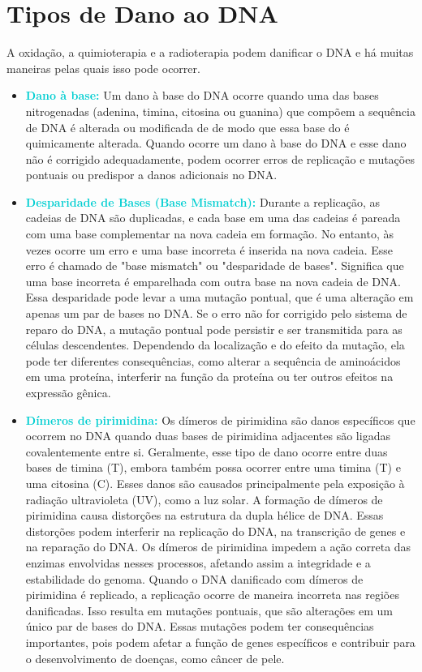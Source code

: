 \documentclass[11pt,a4paper]{article}
\begin{document}
\section{Tipos de Dano ao DNA}

	A oxidação, a quimioterapia e a radioterapia podem danificar o DNA e há muitas maneiras pelas quais isso pode ocorrer.

	\begin{itemize}[label=\textcolor{CarnationPink}{$\blacktriangleright$}]
		\item \textcolor{DarkTurquoise}{\textbf{Dano à base: }} Um dano à base do DNA ocorre quando uma das bases nitrogenadas (adenina, timina, citosina ou guanina) que compõem a sequência de DNA é alterada ou modificada de de modo que essa base do é quimicamente alterada. Quando ocorre um dano à base do DNA e esse dano não é corrigido adequadamente, podem ocorrer erros de replicação e mutações pontuais ou predispor a danos adicionais no DNA.
		
		\item \textcolor{DarkTurquoise}{\textbf{Desparidade de Bases (Base Mismatch):}} Durante a replicação, as cadeias de DNA são duplicadas, e cada base em uma das cadeias é pareada com uma base complementar na nova cadeia em formação. No entanto, às vezes ocorre um erro e uma base incorreta é inserida na nova cadeia. Esse erro é chamado de "base mismatch" ou "desparidade de bases". Significa que uma base incorreta é emparelhada com outra base na nova cadeia de DNA. Essa desparidade pode levar a uma mutação pontual, que é uma alteração em apenas um par de bases no DNA. Se o erro não for corrigido pelo sistema de reparo do DNA, a mutação pontual pode persistir e ser transmitida para as células descendentes. Dependendo da localização e do efeito da mutação, ela pode ter diferentes consequências, como alterar a sequência de aminoácidos em uma proteína, interferir na função da proteína ou ter outros efeitos na expressão gênica.
		
		\item \textcolor{DarkTurquoise}{\textbf{Dímeros de pirimidina:}} Os dímeros de pirimidina são danos específicos que ocorrem no DNA quando duas bases de pirimidina adjacentes são ligadas covalentemente entre si. Geralmente, esse tipo de dano ocorre entre duas bases de timina (T), embora também possa ocorrer entre uma timina (T) e uma citosina (C). Esses danos são causados principalmente pela exposição à radiação ultravioleta (UV), como a luz solar. A formação de dímeros de pirimidina causa distorções na estrutura da dupla hélice de DNA. Essas distorções podem interferir na replicação do DNA, na transcrição de genes e na reparação do DNA. Os dímeros de pirimidina impedem a ação correta das enzimas envolvidas nesses processos, afetando assim a integridade e a estabilidade do genoma. Quando o DNA danificado com dímeros de pirimidina é replicado, a replicação ocorre de maneira incorreta nas regiões danificadas. Isso resulta em mutações pontuais, que são alterações em um único par de bases do DNA. Essas mutações podem ter consequências importantes, pois podem afetar a função de genes específicos e contribuir para o desenvolvimento de doenças, como câncer de pele.
		

\end{itemize}
\end{document}

